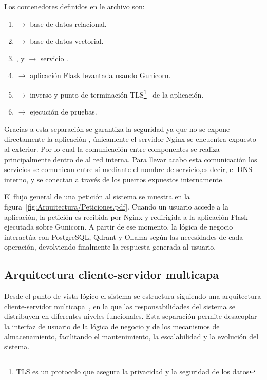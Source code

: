 Los contenedores definidos en le archivo  son:
\begin{enumerate}
	\item {} $\to$ base de datos relacional.
	\item {} $\to$ base de datos vectorial.
	\item {},  y  $\to$ servicio .
	\item {} $\to$ aplicación  Flask levantada usando Gunicorn.
	\item {} $\to$  inverso y punto de terminación TLS\footnote{TLS es un protocolo que asegura la privacidad y la seguridad de los datos}~\cite{diseño:TLS} de la aplicación.
	\item {} $\to$ ejecución de pruebas.
\end{enumerate}

Gracias a esta separación se garantiza la seguridad ya que no se expone directamente la aplicación , únicamente el servidor Nginx se encuentra expuesto al exterior. Por lo cual la comunicación entre componentes se realiza principalmente dentro de al red interna. Para llevar acabo esta comunicación los servicios se comunican entre sí mediante el nombre de servicio,es decir, el DNS interno, y se conectan a través de los puertos expuestos internamente.
 
El flujo general de una petición al sistema se muestra en la figura~\ref{fig:Arquitectura/Peticiones.pdf}. Cuando un usuario accede a la aplicación, la petición es recibida por Nginx y redirigida a la aplicación Flask ejecutada sobre Gunicorn. A partir de ese momento, la lógica de negocio interactúa con PostgreSQL, Qdrant y Ollama según las necesidades de cada operación, devolviendo finalmente la respuesta generada al usuario. 
 


\subsection{Arquitectura cliente-servidor multicapa}
Desde el punto de vista lógico el sistema se estructura siguiendo una arquitectura cliente-servidor multicapa~\cite{diseño:tresNiveles}, en la que las responsabilidades del sistema se distribuyen en diferentes niveles funcionales. Esta separación permite desacoplar la interfaz de usuario de la lógica de negocio y de los mecanismos de almacenamiento, facilitando el mantenimiento, la escalabilidad y la evolución del sistema.

